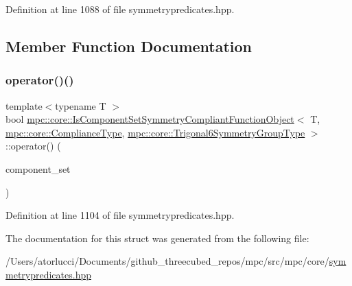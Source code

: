 Definition at line 1088 of file symmetrypredicates.\+hpp.



\subsection{Member Function Documentation}
\mbox{\label{structmpc_1_1core_1_1_is_component_set_symmetry_compliant_function_object_3_01_t_00_01mpc_1_1cor7e9d925cc161002e187fa51051b32e07_a903bd64b4620a6843a873024b35d26f1}} 
\subsubsection{\texorpdfstring{operator()()}{operator()()}}
{\footnotesize\ttfamily template$<$typename T $>$ \\
bool \mbox{\hyperlink{structmpc_1_1core_1_1_is_component_set_symmetry_compliant_function_object}{mpc\+::core\+::\+Is\+Component\+Set\+Symmetry\+Compliant\+Function\+Object}}$<$ T, \mbox{\hyperlink{structmpc_1_1core_1_1_compliance_type}{mpc\+::core\+::\+Compliance\+Type}}, \mbox{\hyperlink{structmpc_1_1core_1_1_trigonal6_symmetry_group_type}{mpc\+::core\+::\+Trigonal6\+Symmetry\+Group\+Type}} $>$\+::operator() (\begin{DoxyParamCaption}\item[{const std\+::set$<$ \mbox{\hyperlink{namespacempc_1_1core_ac3a232afc7c680d580628e834030482f}{mpc\+::core\+::\+Tensor\+Rank4\+Component}}$<$ T $>$ $>$ \&}]{component\+\_\+set }\end{DoxyParamCaption})\hspace{0.3cm}{\ttfamily [inline]}}



Definition at line 1104 of file symmetrypredicates.\+hpp.



The documentation for this struct was generated from the following file\+:\begin{DoxyCompactItemize}
\item 
/\+Users/atorlucci/\+Documents/github\+\_\+threecubed\+\_\+repos/mpc/src/mpc/core/\mbox{\hyperlink{symmetrypredicates_8hpp}{symmetrypredicates.\+hpp}}\end{DoxyCompactItemize}
